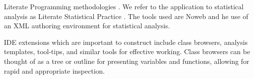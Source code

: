 \documentclass{article}
\newcommand*{\XLispStat}{\textsc{XLispStat}}
\newcommand*{\Stata}{\textsc{Stata}}
\begin{document}
Literate Programming methodologies \citep{Knuth:1992,NRamsey:1994}.
We refer to the application to statistical analysis as Literate
Statistical Practice \citep{rossini:dsc:2001}.  The tools used are
Noweb \citep{NRamsey:1994} and he use of an XML authoring environment
for statistical analysis.

IDE extensions which are important to construct include class
browsers, analysis templates, tool-tips, and similar tools for
effective working.  Class browsers can be thought of as a tree or
outline for presenting variables and functions, allowing for rapid and
appropriate inspection.



\end{document}
